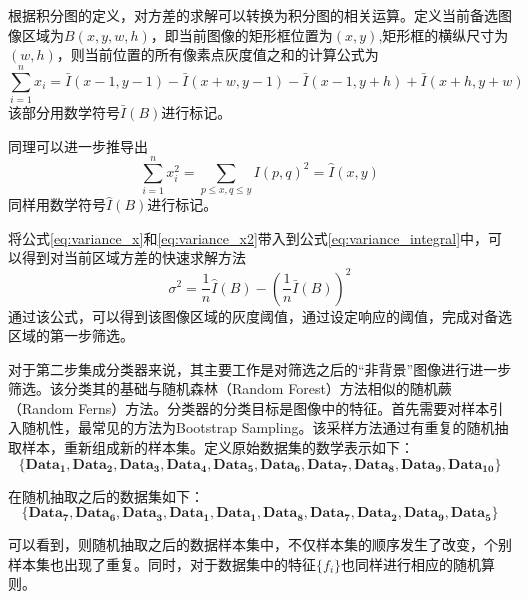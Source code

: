 根据积分图的定义，对方差的求解可以转换为积分图的相关运算。定义当前备选图像区域为$B(x,y,w,h)$，即当前图像的矩形框位置为$(x,y)$,矩形框的横纵尺寸为$(w,h)$，则当前位置的所有像素点灰度值之和的计算公式为
\begin{equation}
\label{eq:variance_x}
\sum_{i=1}^nx_i = \bar{I}(x-1, y-1)-\bar{I}(x+w,y-1)-\bar{I}(x-1,y+h)+\bar{I}(x+h,y+w)
\end{equation}
该部分用数学符号$\bar{I}(B)$进行标记。

同理可以进一步推导出
\begin{equation}
\label{eq:variance_x2}
\sum_{i=1}^nx_i^2 = \sum_{p \le x, q \le y}I(p,q)^2 = \hat{I}(x,y)
\end{equation}
同样用数学符号$\hat{I}(B)$进行标记。

将公式\ref{eq:variance_x}和\ref{eq:variance_x2}带入到公式\ref{eq:variance_integral}中，可以得到对当前区域方差的快速求解方法
\begin{equation}
\sigma^2=\frac{1}{n}\hat{I}(B)-(\frac{1}{n}\bar{I}(B))^2
\end{equation}
通过该公式，可以得到该图像区域的灰度阈值，通过设定响应的阈值，完成对备选区域的第一步筛选。

对于第二步集成分类器来说，其主要工作是对筛选之后的“非背景”图像进行进一步筛选。该分类其的基础与随机森林（Random Forest）方法相似的随机蕨（Random Ferns）方法。分类器的分类目标是图像中的特征。首先需要对样本引入随机性，最常见的方法为Bootstrap Sampling。该采样方法通过有重复的随机抽取样本，重新组成新的样本集。定义原始数据集的数学表示如下：
$$\mathbf{\{Dat}{{\mathbf{a}}_{\mathbf{1}}}\mathbf{,Dat}{{\mathbf{a}}_{\mathbf{2}}}\mathbf{,Dat}{{\mathbf{a}}_{\mathbf{3}}}\mathbf{,Dat}{{\mathbf{a}}_{\mathbf{4}}}\mathbf{,Dat}{{\mathbf{a}}_{\mathbf{5}}}\mathbf{,Dat}{{\mathbf{a}}_{\mathbf{6}}}\mathbf{,Dat}{{\mathbf{a}}_{\mathbf{7}}}\mathbf{,Dat}{{\mathbf{a}}_{\mathbf{8}}}\mathbf{,Dat}{{\mathbf{a}}_{\mathbf{9}}}\mathbf{,Dat}{{\mathbf{a}}_{\mathbf{10}}}\mathbf{\}}$$

在随机抽取之后的数据集如下：
$$\mathbf{\{Dat}{{\mathbf{a}}_{\mathbf{7}}}\mathbf{,Dat}{{\mathbf{a}}_{\mathbf{6}}}\mathbf{,Dat}{{\mathbf{a}}_{\mathbf{3}}}\mathbf{,Dat}{{\mathbf{a}}_{\mathbf{1}}}\mathbf{,Dat}{{\mathbf{a}}_{\mathbf{1}}}\mathbf{,Dat}{{\mathbf{a}}_{\mathbf{8}}}\mathbf{,Dat}{{\mathbf{a}}_{\mathbf{7}}}\mathbf{,Dat}{{\mathbf{a}}_{\mathbf{2}}}\mathbf{,Dat}{{\mathbf{a}}_{\mathbf{9}}}\mathbf{,Dat}{{\mathbf{a}}_{\mathbf{5}}}\mathbf{\}}$$

可以看到，则随机抽取之后的数据样本集中，不仅样本集的顺序发生了改变，个别样本集也出现了重复。同时，对于数据集中的特征$\{f_i\}$也同样进行相应的随机算则。

